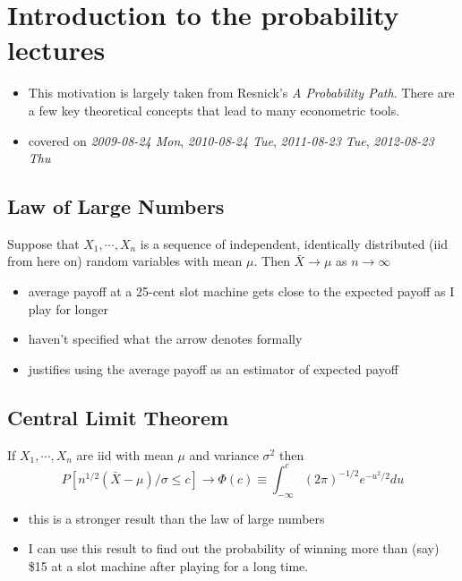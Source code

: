 
\chapter{Introduction to the probability lectures}

\begin{itemize}
\item This motivation is largely taken from Resnick's \emph{A Probability      Path}.  There are a few key theoretical concepts that lead to
     many econometric tools.
\item covered on \textit{2009-08-24 Mon}, \textit{2010-08-24 Tue}, \textit{2011-08-23 Tue},
     \textit{2012-08-23 Thu}
\end{itemize}
\section{Law of Large Numbers}
\label{sec-1}

     Suppose that $X_1,\cdots,X_n$ is a sequence of independent,
     identically distributed (iid from here on) random variables with
     mean $\mu$.  Then $\bar X \to \mu$ as $n \to \infty$
\begin{itemize}
\item average payoff at a 25-cent slot machine gets close to the
       expected payoff as I play for longer
\item haven't specified what the arrow denotes formally
\item justifies using the average payoff as an estimator of expected
       payoff
\end{itemize}
\section{Central Limit Theorem}
\label{sec-2}

     If $X_1,\cdots,X_n$ are iid with mean $\mu$ and variance $\sigma$$^2$
     then
     \[ P[n^{1/2}(\bar X - \mu)/\sigma \leq c] \to \Phi(c)
      \equiv \int_{-\infty}^c (2\pi)^{-1/2} e^{-u^2/2} du
     \]
\begin{itemize}
\item this is a stronger result than the law of large numbers
\item I can use this result to find out the probability of winning more
       than (say) \$15 at a slot machine after playing for a long time.
\end{itemize}

